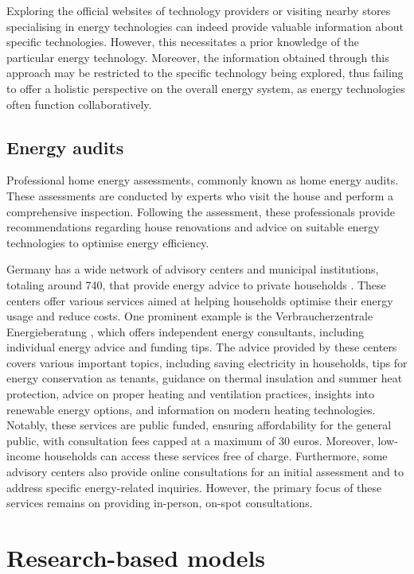 Exploring the official websites of technology providers or visiting nearby stores specialising in energy technologies can indeed provide valuable information about specific technologies. 
However, this necessitates a prior knowledge of the particular energy technology.
Moreover, the information obtained through this approach may be restricted to the specific technology being explored, 
thus failing to offer a holistic perspective on the overall energy system, as energy technologies often function collaboratively.


\subsection{Energy audits}

Professional home energy assessments, commonly known as home energy audits.
These assessments are conducted by experts who visit the house and perform a comprehensive inspection. 
Following the assessment, these professionals provide recommendations regarding house renovations and advice on suitable energy technologies to optimise energy efficiency. 

Germany has a wide network of advisory centers and municipal institutions, totaling around 740, that provide energy advice to private households \cite{bmwk2023}. 
These centers offer various services aimed at helping households optimise their energy usage and reduce costs. 
One prominent example is the Verbraucherzentrale Energieberatung \cite{VB2023}, 
which offers independent energy consultants, including individual energy advice and funding tips. 
The advice provided by these centers covers various important topics, including saving electricity in households, tips for energy conservation as tenants, guidance on thermal insulation and summer heat protection, advice on proper heating and ventilation practices, insights into renewable energy options, and information on modern heating technologies.
Notably, these services are public funded, ensuring affordability for the general public, with consultation fees capped at a maximum of 30 euros. 
Moreover, low-income households can access these services free of charge.
Furthermore, some advisory centers also provide online consultations for an initial assessment and to address specific energy-related inquiries. 
However, the primary focus of these services remains on providing in-person, on-spot consultations. 


\section{Research-based models}

